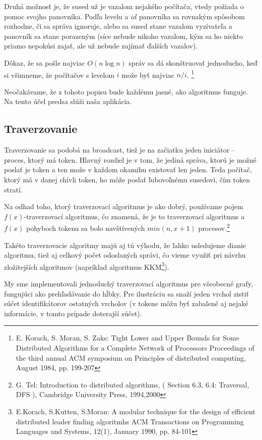 Druhá možnosť je, že sused už je vazalom nejakého počítača, vtedy požiada o pomoc svojho panovníka.
Podľa levelu a $id$ panovníka sa rovnakým spôsobom rozhodne, či sa správa ignoruje, alebo 
sa sused stane vazalom vyzívateľa a panovník sa stane porazeným (síce nebude nikoho vazalom, kým sa
ho niekto priamo nepokúsi zajať, ale už nebude zajímať ďalších vazalov).

Dôkaz, že sa pošle najviac $O(n\log n)$ správ sa dá skonštruovať jednoducho, keď si všimneme, 
že počítačov s levelom $i$ može byť najviac $n/i$.
\footnote{E. Korach, S. Moran, S. Zaks: Tight Lower and Upper Bounds for Some Distributed Algorithms
for a Complete Network of Processors Proceedings of the third annual ACM symposium on Principles of
distributed computing, August 1984, pp. 199-207}
 
Neočakávame, že z tohoto popisu bude každému jasné, ako algoritmus funguje. Na tento účel predsa
slúži naša aplikácia.

\subsection{Traverzovanie}

Traverzovanie sa podobá na broadcast, tiež je na začiatku jeden iniciátor -- proces, ktorý má token.
Hlavný rozdiel je  v tom, že jediná správa, ktorú je možné poslať je token a ten može v každom
okamihu existovať len jeden. Teda počítač, ktorý má v danej chívli token, ho môže poslať ľubovoľnému
susedovi, čím token stratí.

Na odhad toho, ktorý traverzovací algoritmus je ako dobrý, používame pojem $f(x)$-traverzovací
algoritmus, čo znamená, že je to traverzovací algoritmus a $f(x)$ pohyboch tokenu sa bolo
navštívených $min(n, x+1)$ procesov.\footnote{G. Tel: Introduction to distributed algorithms, ( Section 6.3, 6.4: Traversal, DFS
), Cambridge University Press, 1994,2000}

Takéto traverzovacie algoritmy majú aj tú výhodu, že ľahko usledujeme dianie algoritmu, tiež aj celkový počet odoslaných
správi, čo vieme využiť pri návrhu zložitejších algoritmov (napríklad algoritmus
KKM\footnote{E.Korach, S.Kutten, S.Moran: A modular technique for the design of efficient
distributed leader finding algoritmhs ACM Transactions on Programming Languages and Systems, 12(1),
January 1990, pp. 84-101}).

My sme implementovali jednoduchý traverzovací algoritmus pre všeobecné grafy, fungujúci ako 
prehľadávanie do hĺbky. Pre ilustráciu sa snaží jeden vrchol zistiť súčet identifikátorov ostatných
vrcholov (v tokene môžu byť zabalené aj nejaké informácie, v tomto prípade doterajší súčet).






